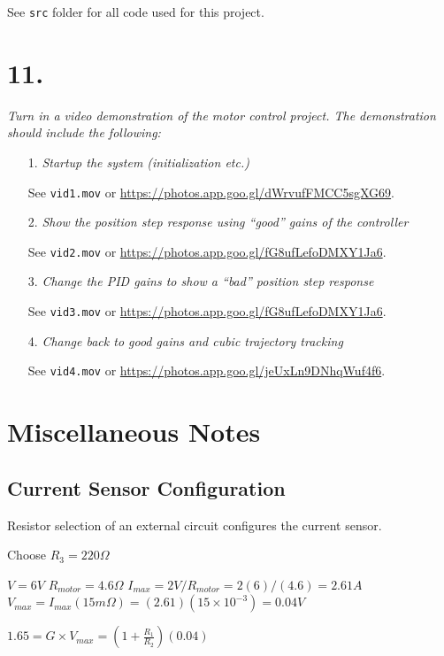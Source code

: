 \documentclass[12pt]{article}
\begin{document}
See \verb|src| folder for all code used for this project.

\section*{11.}
\textit{Turn in a video demonstration of the motor control project.  The demonstration should include the following:}
\begin{enumerate}
    \item[1.]
    \textit{Startup the system (initialization etc.)}

    See \verb|vid1.mov| or \url{https://photos.app.goo.gl/dWrvufFMCC5sgXG69}.

    \item[2.]
    \textit{Show the position step response using “good” gains of the controller}

    See \verb|vid2.mov| or \url{https://photos.app.goo.gl/fG8ufLefoDMXY1Ja6}.

    \item[3.]
    \textit{Change the PID gains to show a “bad” position step response}

    See \verb|vid3.mov| or \url{https://photos.app.goo.gl/fG8ufLefoDMXY1Ja6}.

    \item[4.]
    \textit{Change back to good gains and cubic trajectory tracking}

    See \verb|vid4.mov| or \url{https://photos.app.goo.gl/jeUxLn9DNhqWuf4f6}.

\end{enumerate}


\pagebreak

\section*{Miscellaneous Notes}
\subsection*{Current Sensor Configuration}
Resistor selection of an external circuit configures the current sensor.

Choose $R_3 = 220 \Omega$

$V = 6V$ %
$R_{motor} = 4.6 \Omega$
$I_{max} = 2V/R_{motor} = 2(6)/(4.6) = 2.61A$ %
$V_{max} = I_{max} (15 m\Omega) = (2.61) (15 \times 10^{-3}) = 0.04 V$

$1.65 = G \times V_{max} = (1+\frac{R_1}{R_2}) (0.04)$
\end{document}
